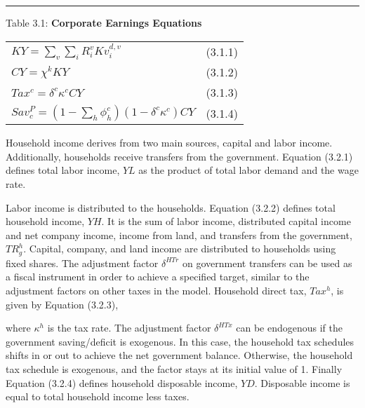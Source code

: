 \documentclass{article}
\begin{document}
\newpage

\noindent\rule{\linewidth}{0.4pt}
\begin{center}
\begin{large}
{\centering Table 3.1: \textbf{Corporate Earnings Equations} \par}

\begin{tabular}{>{\raggedright}p{} l}

$KY = \displaystyle \sum_v \sum_i R^v_i Kv^{d, v}_i$ & (3.1.1)\\[15pt]

$CY = \chi^k K\!Y$ & (3.1.2)\\[15pt]

$Tax^c = \delta^c\kappa^cCY$ & (3.1.3) \\[15pt]

$Sav^P_c = \left(1- \displaystyle \sum_h \phi^c_h \right)(1-\delta^c\kappa^c)CY$ & (3.1.4) \\[15pt]
\hline
\end{tabular}
\end{large}
\end{center}

Household income derives from two main sources, capital and labor income. Additionally, households receive transfers from the government. Equation (3.2.1) defines total labor income, $YL$ as the product of total labor demand and the wage rate.

Labor income is distributed to the households. Equation (3.2.2) defines total household income, $YH$. It is the sum of labor income, distributed capital income and net company income, income from land, and transfers from the government, $TR_g^h$. Capital, company, and land income are distributed to households using fixed shares. The adjustment factor $\delta^{HTr}$ on government transfers can be used as a fiscal instrument in order to achieve a specified target, similar to the adjustment factors on other taxes in the model. Household direct tax, $Tax^h$, is given by Equation (3.2.3), 

where $\kappa^h$ is the tax rate. The adjustment factor $\delta^{HTx}$ can be endogenous if the government saving/deficit is exogenous. In this case, the household tax schedules shifts in or out to achieve the net government balance. Otherwise, the household tax schedule is exogenous, and the factor stays at its initial value of 1. Finally Equation (3.2.4) defines household disposable income, $YD$. Disposable income is equal to total household income less taxes.
\end{document}
